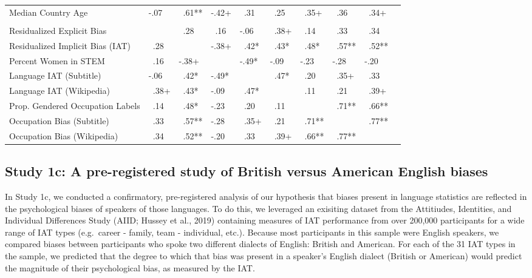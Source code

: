\documentclass[man,floatsintext]{apa6}
\begin{document}
\begin{longtable}{llllllllll}
\hspace{1em}Median Country Age & -.07 & \ .61** & -.42+ & \ .31 & \ .25 & \ .35+ & \ .36 & \ .34+ & \\
\addlinespace[0.3em]
\multicolumn{10}{l}{\textbf{Partial Correlations}}\\
\hspace{1em}Residualized Explicit Bias &  & \ .28 & \ .16 & -.06 & \ .38+ & \ .14 & \ .33 & \ .34 & \\
\hspace{1em}Residualized Implicit Bias (IAT) & \ .28 &  & -.38+ & \ .42* & \ .43* & \ .48* & \ .57** & \ .52** & \\
\hspace{1em}Percent Women in STEM & \ .16 & -.38+ &  & -.49* & -.09 & -.23 & -.28 & -.20 & \\
\hspace{1em}Language IAT (Subtitle) & -.06 & \ .42* & -.49* &  & \ .47* & \ .20 & \ .35+ & \ .33 & \\
\hspace{1em}Language IAT (Wikipedia) & \ .38+ & \ .43* & -.09 & \ .47* &  & \ .11 & \ .21 & \ .39+ & \\
\hspace{1em}Prop. Gendered Occupation Labels & \ .14 & \ .48* & -.23 & \ .20 & \ .11 &  & \ .71** & \ .66** & \\
\hspace{1em}Occupation Bias (Subtitle) & \ .33 & \ .57** & -.28 & \ .35+ & \ .21 & \ .71** &  & \ .77** & \\
\hspace{1em}Occupation Bias (Wikipedia) & \ .34 & \ .52** & -.20 & \ .33 & \ .39+ & \ .66** & \ .77** &  & \\
\bottomrule
\end{longtable}\endgroup{}

\hypertarget{study-1c-a-pre-registered-study-of-british-versus-american-english-biases}{%
\subsection{Study 1c: A pre-registered study of British versus American English biases}\label{study-1c-a-pre-registered-study-of-british-versus-american-english-biases}}

In Study 1c, we conducted a confirmatory, pre-registered analysis of our hypothesis that biases present in language statistics are reflected in the psychological biases of speakers of those languages. To do this, we leveraged an exisiting dataset from the Attitiudes, Identities, and Individual Differences Study (AIID; Hussey et al., 2019) containing measures of IAT performance from over 200,000 participants for a wide range of IAT types (e.g.~career - family, team - individual, etc.). Because most participants in this sample were English speakers, we compared biases between participants who spoke two different dialects of English: British and American. For each of the 31 IAT types in the sample, we predicted that the degree to which that bias was present in a speaker's English dialect (British or American) would predict the magnitude of their psychological bias, as measured by the IAT.
\end{document}
